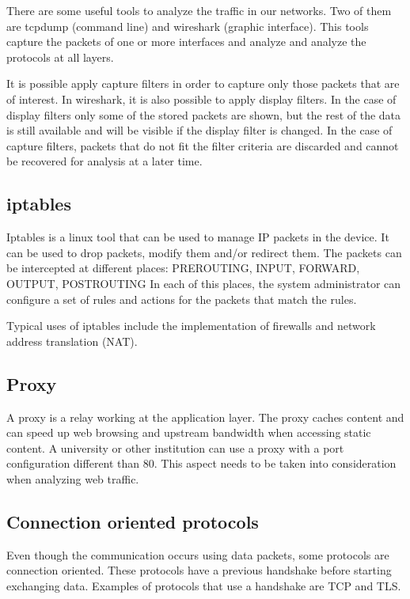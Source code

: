 There are some useful tools to analyze the traffic in our networks.
Two of them are tcpdump (command line) and wireshark (graphic interface).
This tools capture the packets of one or more interfaces and analyze and analyze the protocols at all layers.

It is possible apply capture filters in order to capture only those packets that are of interest.
In wireshark, it is also possible to apply display filters.
In the case of display filters only some of the stored packets are shown, but the rest of the data is still available and will be visible if the display filter is changed.
In the case of capture filters, packets that do not fit the filter criteria are discarded and cannot be recovered for analysis at a later time.

\subsection{iptables}

Iptables is a linux tool that can be used to manage IP packets in the device.
It can be used to drop packets, modify them and/or redirect them.
The packets can be intercepted at different places: PREROUTING, INPUT, FORWARD, OUTPUT, POSTROUTING
In each of this places, the system administrator can configure a set of rules and actions for the packets that match the rules.

Typical uses of iptables include the implementation of firewalls and network address translation (NAT).

\subsection{Proxy}

A proxy is a relay working at the application layer.
The proxy caches content and can speed up web browsing and upstream bandwidth when accessing static content.
A university or other institution can use a proxy with a port configuration different than 80.
This aspect needs to be taken into consideration when analyzing web traffic.

\subsection{Connection oriented protocols}

Even though the communication occurs using data packets, some protocols are connection oriented.
These protocols have a previous handshake before starting exchanging data.
Examples of protocols that use a handshake are TCP and TLS.

